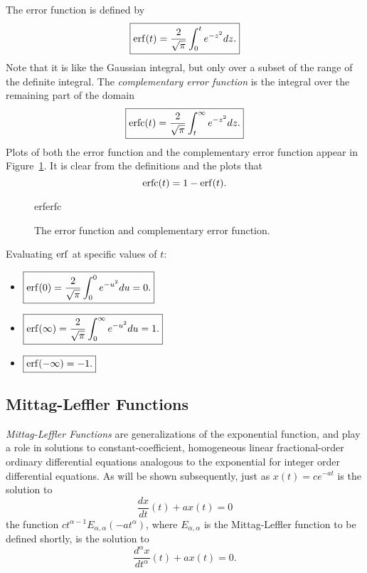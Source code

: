 The error function is defined by
\begin{equation}
  \boxed{ \operatorname{erf}(t) = \frac{2}{\sqrt{\pi}} \int_0^t e^{-z^2} dz. }
  \label{eq:erf}
\end{equation}
Note that it is like the Gaussian integral, but only over a subset of the range of the definite integral. The \emph{complementary error function} is the integral over the remaining part of the domain
\begin{equation}
  \boxed{ \operatorname{erfc}(t)  = \frac{2}{\sqrt{\pi}} \int_t^\infty e^{-z^2} dz. }
  \label{eq:erfc}
\end{equation}
Plots of both the error function and the complementary error function appear in Figure~\ref{fig:erferfc}. It is clear from the definitions and the plots that
\begin{equation}
  \operatorname{erfc}(t) = 1 - \operatorname{erf}(t).
  \label{eq:erfs}
\end{equation}

\begin{figure}
  \centering
  {erferfc}
  \caption{The error function and complementary error function.}
  \label{fig:erferfc}
\end{figure}

Evaluating $\operatorname{erf}$ at specific values of $t$:
\begin{itemize}
  \item $ \boxed{ \operatorname{erf}(0) = \frac{2}{\sqrt{ \pi} } \int_0^0 e^{-u^2} du = 0. }$
  \item $ \boxed{ \operatorname{erf}(\infty) = \frac{2}{\sqrt{ \pi }} \int_0^\infty e^{-u^2} du = 1. }$
  \item $ \boxed{ \operatorname{erf}(-\infty) = -1. }$
\end{itemize}

\subsection{Mittag-Leffler Functions}
\emph{Mittag-Leffler Functions} are generalizations of the exponential function, and play a role in solutions to constant-coefficient, homogeneous linear fractional-order ordinary differential equations analogous to the exponential for integer order differential equations. As will be shown subsequently, just as $x(t) = c e^{-a t}$ is the solution to
\begin{equation*}
  \frac{dx}{dt}(t) + a x(t) = 0
\end{equation*}
the function $c t^{\alpha - 1} E_{\alpha,\alpha}\left(-a t^\alpha\right)$, where $E_{\alpha,\alpha}$ is the Mittag-Leffler function to be defined shortly, is the solution to 
\begin{equation*}
  \frac{d^\alpha x}{dt^\alpha}(t) + a x(t) = 0.
\end{equation*}


